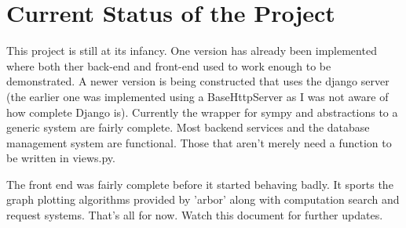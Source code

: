 \documentclass{article}
\begin{document}
\section{Current Status of the Project}
This project is still at its infancy. One version has already been implemented where both ther back-end and front-end used to work enough to be demonstrated. A newer version is being constructed that uses the django server (the earlier one was implemented using a BaseHttpServer as I was not aware of how complete Django is). Currently the wrapper for sympy and abstractions to a generic system are fairly complete. Most backend services and the database management system are functional. Those that aren't merely need a function to be written in views.py. 

The front end was fairly complete before it started behaving badly. It sports the graph plotting algorithms provided by 'arbor' along with computation search and request systems. That's all for now. Watch this document for further updates.
\end{document}
